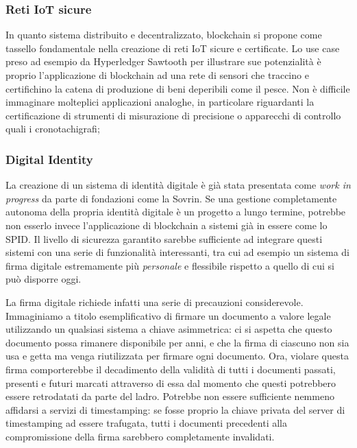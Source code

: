     \subsubsection{Reti IoT sicure}
        	In quanto sistema distribuito e decentralizzato, blockchain si propone come tassello fondamentale nella creazione di reti IoT sicure e certificate. Lo use case preso ad esempio da Hyperledger Sawtooth per illustrare sue potenzialità è proprio l'applicazione di blockchain ad una rete di sensori che traccino e certifichino la catena di produzione di beni deperibili come il pesce. Non è difficile immaginare molteplici applicazioni analoghe, in particolare riguardanti la certificazione di strumenti di misurazione di precisione o apparecchi di controllo quali i cronotachigrafi;
        	
        \subsubsection{Digital Identity}
        	La creazione di un sistema di identità digitale è già stata presentata come \emph{work in progress} da parte di fondazioni come la Sovrin. Se una gestione completamente autonoma della propria identità digitale è un progetto a lungo termine, potrebbe non esserlo invece l'applicazione di blockchain a sistemi già in essere come lo SPID. Il livello di sicurezza garantito sarebbe sufficiente ad integrare questi sistemi con una serie di funzionalità interessanti, tra cui ad esempio un sistema di firma digitale estremamente più \emph{personale} e flessibile rispetto a quello di cui si può disporre oggi.
        	
        	La firma digitale richiede infatti una serie di precauzioni considerevole. Immaginiamo a titolo esemplificativo di firmare un documento a valore legale utilizzando un qualsiasi sistema a chiave asimmetrica: ci si aspetta che questo documento possa rimanere disponibile per anni, e che la firma di ciascuno non sia usa e getta ma venga riutilizzata per firmare ogni documento. Ora, violare questa firma comporterebbe il decadimento della validità di tutti i documenti passati, presenti e futuri marcati attraverso di essa dal momento che questi potrebbero essere retrodatati da parte del ladro. Potrebbe non essere sufficiente nemmeno affidarsi a servizi di timestamping: se fosse proprio la chiave privata del server di timestamping ad essere trafugata, tutti i documenti precedenti alla compromissione della firma sarebbero completamente invalidati.
        	
